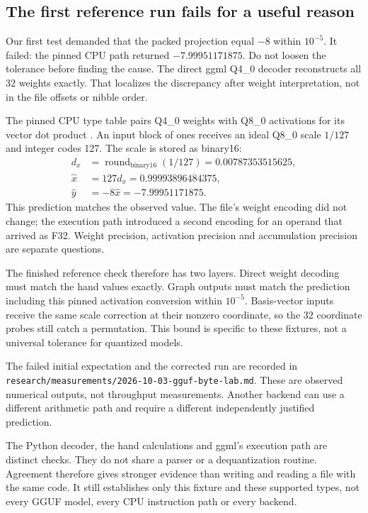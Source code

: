 \subsection{The first reference run fails for a useful reason}
Our first test demanded that the packed projection equal $-8$ within
$10^{-5}$. It failed: the pinned CPU path returned
$-7.99951171875$. Do not loosen the tolerance before finding the
cause. The direct ggml Q4\_0 decoder reconstructs all 32 weights
exactly. That localizes the discrepancy after weight interpretation,
not in the file offsets or nibble order.

The pinned CPU type table pairs Q4\_0 weights with Q8\_0 activations
for its vector dot product \cite{ggml2026cpupinned}. An input block
of ones receives an ideal Q8\_0 scale $1/127$ and integer codes 127.
The scale is stored as binary16:
\begin{align}
d_x &= \operatorname{round}_{\mathrm{binary16}}(1/127)
       =0.00787353515625,\\
\widehat x &=127d_x=0.99993896484375,\\
\widehat y &=-8\widehat x=-7.99951171875.
\end{align}
This prediction matches the observed value. The file's weight
encoding did not change; the execution path introduced a second
encoding for an operand that arrived as F32. Weight precision,
activation precision and accumulation precision are separate questions.

The finished reference check therefore has two layers. Direct weight
decoding must match the hand values exactly. Graph outputs must match
the prediction including this pinned activation conversion within
$10^{-5}$. Basis-vector inputs receive the same scale correction
at their nonzero coordinate, so the 32 coordinate probes still
catch a permutation. This bound is specific to these fixtures,
not a universal tolerance for quantized models.

The failed initial expectation and the corrected run are recorded in
\texttt{research/measurements/2026-10-03-gguf-byte-lab.md}.
These are observed numerical outputs, not throughput measurements.
Another backend can use a different arithmetic path and require a
different independently justified prediction.

The Python decoder, the hand calculations and ggml's execution path
are distinct checks. They do not share a parser or a dequantization
routine. Agreement therefore gives stronger evidence than writing
and reading a file with the same code. It still establishes only
this fixture and these supported types, not every GGUF model,
every CPU instruction path or every backend.

